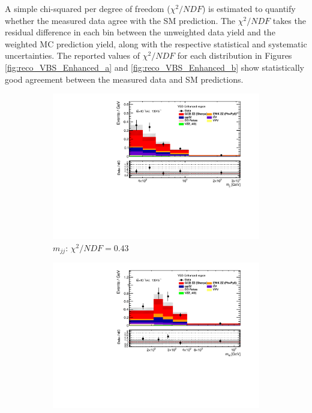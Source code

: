 A simple chi-squared per degree of freedom ($\chi^2/NDF$) is estimated to quantify whether the measured data agree with the SM prediction. The $\chi^2/NDF$ takes the residual difference in each bin between the unweighted data yield and the weighted MC prediction yield, along with the respective statistical and systematic uncertainties. The reported values of $\chi^2/NDF$ for each distribution in Figures \ref{fig:reco_VBS_Enhanced_a} and \ref{fig:reco_VBS_Enhanced_b} show statistically good agreement between the measured data and SM predictions. 

\begin{figure}[!htb]
    \centering
    \begin{subfigure}{.49\textwidth}
        \centering
        \includegraphics[width=.98\linewidth]{figures/Results/RecoDist_VBSEnhanced/reco_mjj_SR.pdf}
        \caption{ \footnotesize{$m_{jj}$}: $\chi^2/NDF = 0.43$ }
    \end{subfigure}
    \begin{subfigure}{.49\textwidth}
        \centering
        \includegraphics[width=.98\linewidth]{figures/Results/RecoDist_VBSEnhanced/reco_m4l_SR.pdf}

\end{subfigure}
\end{figure}
